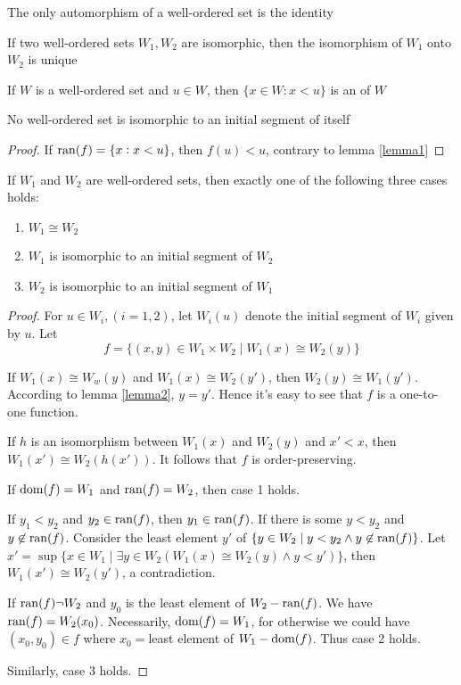 \documentclass[11pt]{article}
\begin{document}
\begin{corollary}[]
The only automorphism of a well-ordered set is the identity
\end{corollary}

\begin{corollary}[]
If two well-ordered sets \(W_1,W_2\) are isomorphic, then the isomorphism of
\(W_1\) onto \(W_2\) is unique
\end{corollary}

If \(W\) is a well-ordered set and \(u\in W\), then \(\{x\in W:x<u\}\) is an
 of \(W\)
\begin{lemma}[]
\label{lemma2}
No well-ordered set is isomorphic to an initial segment of itself
\end{lemma}
\begin{proof}
If \(\mathrm{ran}{(f)}=\{x:x<u\}\), then \(f(u)<u\), contrary to lemma \ref{lemma1}
\end{proof}

\begin{theorem}[]
If \(W_1\) and \(W_2\) are well-ordered sets, then exactly one of the following
three cases holds:
\begin{enumerate}
\item \(W_1\cong W_2\)
\item \(W_1\) is isomorphic to an initial segment of \(W_2\)
\item \(W_2\) is isomorphic to an initial segment of \(W_1\)
\end{enumerate}
\end{theorem}
\begin{proof}
For \(u\in W_i,(i=1,2)\), let \(W_i(u)\) denote the initial segment of \(W_i\)
given by \(u\). Let
\begin{equation*}
f=\{(x,y)\in W_1\times W_2\mid W_1(x)\cong W_2(y)\}
\end{equation*}

If \(W_1(x)\cong W_w(y)\) and \(W_1(x)\cong W_2(y')\), then \(W_2(y)\cong
   W_1(y')\). According to lemma \ref{lemma2}, \(y=y'\). Hence it's easy to see that
\(f\) is a one-to-one function.

If \(h\) is an isomorphism between \(W_1(x)\) and \(W_2(y)\) and \(x'<x\), then
\(W_1(x')\cong W_2(h(x'))\). It follows that \(f\) is order-preserving.

If \(\mathrm{dom}{(f)}=W_1\) and \(\mathrm{ran}{(f)}=W_2\), then case 1 holds.

If \(y_1<y_2\) and \(y_2\in \mathrm{ran}{(f)}\), then \(y_1\in\mathrm{ran}{(f)}\). If there is some
\(y<y_2\) and \(y\not\in\mathrm{ran}{(f)}\). Consider the least element \(y'\) of \(\{y\in
   W_2\mid y<y_2\wedge y\not\in\mathrm{ran}{(f)}\}\). Let \(x'=\sup\{x\in W_1\mid\exists
   y\in W_2(W_1(x)\cong W_2(y)\wedge y<y')\}\), then \(W_1(x')\cong W_2(y')\), a
contradiction. 

If \(\mathrm{ran}{(f)}\neg W_2\) and \(y_0\) is the least element of \(W_2-\mathrm{ran}{(f)}\). We have
\(\mathrm{ran}{(f)}=W_2(x_0)\). Necessarily, \(\mathrm{dom}{(f)}=W_1\), for otherwise we could have
\((x_0,y_0)\in f\) where \(x_0=\)least element of \(W_1-\mathrm{dom}{(f)}\). Thus case 2
holds.

Similarly, case 3 holds.
\end{proof}
\end{document}
